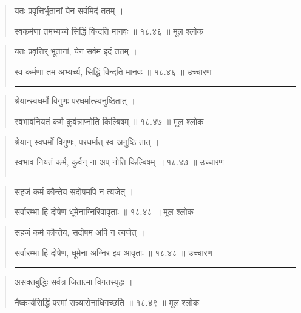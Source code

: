 \begin{quotation}

यतः प्रवृत्तिर्भूतानां येन सर्वमिदं ततम्‌ ।  

स्वकर्मणा तमभ्यर्च्य सिद्धिं विन्दति मानवः  ॥ १८.४६ ॥  मूल श्लोक
\end{quotation}

\begin{quotation}

यतः प्रवृत्तिर् भूतानां, येन सर्वम इदं ततम्‌ ।  

स्व-कर्मणा तम अभ्यर्च्य, सिद्धिं विन्दति मानवः  ॥ १८.४६ ॥  उच्चारण

\noindent\rule{16cm}{0.4pt} 
\end{quotation}


\begin{quotation}

श्रेयान्स्वधर्मो विगुणः परधर्मात्स्वनुष्ठितात्‌ ।  

स्वभावनियतं कर्म कुर्वन्नाप्नोति किल्बिषम्‌  ॥ १८.४७ ॥  मूल श्लोक
\end{quotation}

\begin{quotation}
श्रेयान् स्वधर्मो विगुणः, परधर्मात् स्व अनुष्ठि-तात्‌ ।  

स्वभाव नियतं कर्म, कुर्वन् ना-अप्-नोति किल्बिषम्‌  ॥ १८.४७ ॥  उच्चारण

\noindent\rule{16cm}{0.4pt} 
\end{quotation}


\begin{quotation}

सहजं कर्म कौन्तेय सदोषमपि न त्यजेत्‌ ।  

सर्वारम्भा हि दोषेण धूमेनाग्निरिवावृताः  ॥ १८.४८ ॥  मूल श्लोक
\end{quotation}

\begin{quotation}

सहजं कर्म कौन्तेय, सदोषम अपि न त्यजेत्‌ ।  

सर्वारम्भा हि दोषेण, धूमेना अग्निर इव-आवृताः  ॥ १८.४८ ॥  उच्चारण

\noindent\rule{16cm}{0.4pt} 
\end{quotation}


\begin{quotation}

असक्तबुद्धिः सर्वत्र जितात्मा विगतस्पृहः ।  

नैष्कर्म्यसिद्धिं परमां सन्न्यासेनाधिगच्छति  ॥ १८.४९ ॥  मूल श्लोक
\end{quotation}

